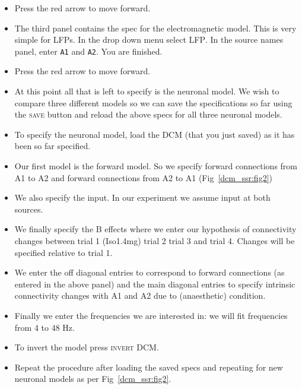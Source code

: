 \begin{itemize}
\item Press the red arrow to move forward.
\item The third panel contains the spec for the electromagnetic model. This is very simple for LFPs. In the drop down menu select \textsc{LFP}. In the source names panel, enter \texttt{A1} and \texttt{A2}. You are finished.
\item Press the red arrow to move forward.
\item At this point all that is left to specify is the neuronal model. We wish to compare three different models so we can save the specifications so far using the \textsc{save} button and reload the above specs for all three neuronal models.
\item To specify the neuronal model, load the DCM (that you just saved) as it has been so far specified.
\item Our first model is the forward model. So we specify forward connections from A1 to A2 and forward connections from A2 to A1 (Fig~\ref{dcm_ssr:fig2})
\item We also specify the input. In our experiment we assume input at both sources.
\item We finally specify the B effects where we enter our hypothesis of connectivity changes between trial 1 (Iso1.4mg) trial 2 trial 3 and trial 4. Changes will be specified relative to trial 1.
\item We enter the off diagonal entries to correspond to forward connections (as entered in the above panel) and the main diagonal entries to specify intrinsic connectivity changes with A1 and A2 due to (anaesthetic) condition.
\item Finally we enter the frequencies we are interested in: we will fit frequencies from 4 to 48 Hz.
\item To invert the model press \textsc{invert DCM}.
\item Repeat the procedure after loading the saved specs and repeating for new neuronal models as per Fig~\ref{dcm_ssr:fig2}.
\end{itemize}

